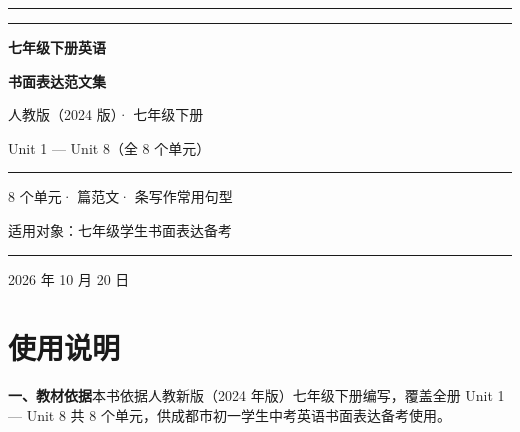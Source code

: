\documentclass[UTF8,a4paper,11pt,oneside]{ctexbook}
\begin{document}
\linespread{1.32}\selectfont

\begin{titlepage}
  \thispagestyle{empty}
  \centering
  \vspace*{1.4cm}
  {\color{mainblue}\rule{\linewidth}{1.8pt}}\par
  \vspace{0.55cm}
  {\color{rulelight}\rule{\linewidth}{0.6pt}}\par
  \vspace{1.5cm}
  {\sffamily\bfseries\fontsize{36pt}{46pt}\selectfont\color{mainblue} 七年级下册英语\par}
  \vspace{0.35cm}
  {\sffamily\bfseries\fontsize{36pt}{46pt}\selectfont\color{mainblue} 书面表达范文集\par}
  \vspace{1.3cm}
  {\sffamily\fontsize{15pt}{21pt}\selectfont\color{accent} 人教版（2024 版）· 七年级下册\par}
  \vspace{0.3cm}
  {\sffamily\Large\color{mainblue} Unit 1 — Unit 8（全 8 个单元）\par}
  \vspace{1.0cm}
  {\color{accent}\rule{0.62\linewidth}{0.8pt}}\par
  \vspace{0.9cm}
  {\sffamily\large\color{textgray} 8 个单元\quad· 篇范文\quad· 条写作常用句型\par}
  \vfill
  {\large\sffamily 适用对象：七年级学生\quad 书面表达备考\par}
  \vspace{0.9cm}
  {\color{rulelight}\rule{0.62\linewidth}{0.6pt}}\par
  \vspace{0.5cm}
  {\sffamily\normalsize\color{textgray} 2026 年 10 月 20 日\par}
  \vspace*{0.6cm}
\end{titlepage}

\frontmatter
\pagestyle{plain}

\chapter*{使用说明}
{}

\noindent\textbf{一、教材依据}\quad 本书依据人教新版（2024 年版）七年级下册编写，覆盖全册
Unit 1 — Unit 8 共 8 个单元，供成都市初一学生中考英语书面表达备考使用。
\end{document}
